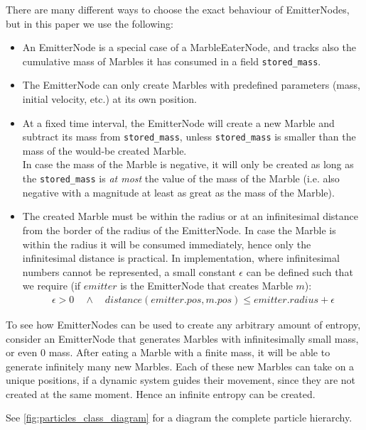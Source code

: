 There are many different ways to choose the exact behaviour of EmitterNodes, but in this paper we use the following:
\begin{itemize}
    \item An EmitterNode is a special case of a MarbleEaterNode, and tracks also the cumulative mass of Marbles it has consumed in a field \texttt{stored\_mass}.
    \item The EmitterNode can only create Marbles with predefined parameters (mass, initial velocity, etc.) at its own position.
    \item At a fixed time interval, the EmitterNode will create a new Marble and subtract its mass from \texttt{stored\_mass}, unless \texttt{stored\_mass} is smaller than the mass of the would-be created Marble. \\
    In case the mass of the Marble is negative, it will only be created as long as the \texttt{stored\_mass} is \textit{at most} the value of the mass of the Marble (i.e. also negative with a magnitude at least as great as the mass of the Marble).
    \item The created Marble must be within the radius or at an infinitesimal distance from the border of the radius of the EmitterNode. In case the Marble is within the radius it will be consumed immediately, hence only the infinitesimal distance is practical. In implementation, where infinitesimal numbers cannot be represented, a small constant $\epsilon$ can be defined such that we require (if $emitter$ is the EmitterNode that creates Marble $m$):
    \begin{align}
        \epsilon > 0 \quad \land \quad distance(emitter.pos, m.pos) \leq emitter.radius + \epsilon
    \end{align}
\end{itemize}

To see how EmitterNodes can be used to create any arbitrary amount of entropy, consider an EmitterNode that generates Marbles with infinitesimally small mass, or even 0 mass. After eating a Marble with a finite mass, it will be able to generate infinitely many new Marbles. Each of these new Marbles can take on a unique positions, if a dynamic system guides their movement, since they are not created at the same moment. Hence an infinite entropy can be created.

See \ref{fig:particles_class_diagram} for a diagram the complete particle hierarchy. 

